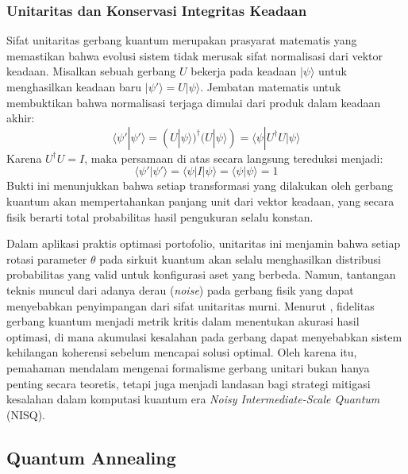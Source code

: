 \subsubsection{Unitaritas dan Konservasi Integritas Keadaan}

Sifat unitaritas gerbang kuantum merupakan prasyarat matematis yang memastikan bahwa evolusi sistem tidak merusak sifat normalisasi dari vektor keadaan. Misalkan sebuah gerbang $U$ bekerja pada keadaan $|\psi\rangle$ untuk menghasilkan keadaan baru $|\psi'\rangle = U|\psi\rangle$. Jembatan matematis untuk membuktikan bahwa normalisasi terjaga dimulai dari produk dalam keadaan akhir:
\begin{equation}
    \langle \psi' | \psi' \rangle = (U|\psi\rangle)^\dagger (U|\psi\rangle) = \langle \psi | U^\dagger U | \psi \rangle
\end{equation}
Karena $U^\dagger U = I$, maka persamaan di atas secara langsung tereduksi menjadi:
\begin{equation}
    \langle \psi' | \psi' \rangle = \langle \psi | I | \psi \rangle = \langle \psi | \psi \rangle = 1
\end{equation}
Bukti ini menunjukkan bahwa setiap transformasi yang dilakukan oleh gerbang kuantum akan mempertahankan panjang unit dari vektor keadaan, yang secara fisik berarti total probabilitas hasil pengukuran selalu konstan.

Dalam aplikasi praktis optimasi portofolio, unitaritas ini menjamin bahwa setiap rotasi parameter $\theta$ pada sirkuit kuantum akan selalu menghasilkan distribusi probabilitas yang valid untuk konfigurasi aset yang berbeda. Namun, tantangan teknis muncul dari adanya derau (\textit{noise}) pada gerbang fisik yang dapat menyebabkan penyimpangan dari sifat unitaritas murni. Menurut \cite{preskill_2018}, fidelitas gerbang kuantum menjadi metrik kritis dalam menentukan akurasi hasil optimasi, di mana akumulasi kesalahan pada gerbang dapat menyebabkan sistem kehilangan koherensi sebelum mencapai solusi optimal. Oleh karena itu, pemahaman mendalam mengenai formalisme gerbang unitari bukan hanya penting secara teoretis, tetapi juga menjadi landasan bagi strategi mitigasi kesalahan dalam komputasi kuantum era \textit{Noisy Intermediate-Scale Quantum} (NISQ).


\subsection{Quantum Annealing}

